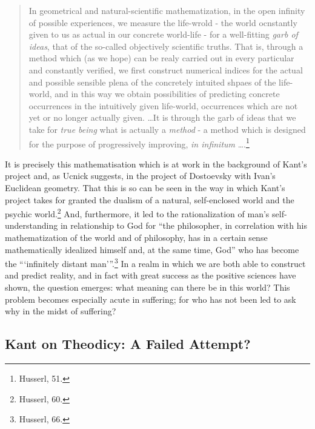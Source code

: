 \documentclass[12pt]{article}
\begin{document}
	\begin{quote}
	\singlespacing
	\footnotesize
	
	In geometrical and natural-scientific mathematization, in the open infinity of possible experiences, we measure the life-wrold - the world ocnstantly given to us as actual in our concrete world-life - for a well-fitting \emph{garb of ideas}, that of the so-called objectively scientific truths. That is, through a method which (as we hope) can be realy carried out in every particular and constantly verified, we first construct numerical indices for the actual and possible sensible plena of the concretely intuited shpaes of the life-world, and in this way we obtain possibilities of predicting concrete occurrences in the intuitively given life-world, occurrences which are not yet or no longer actually given. \ldots It is through the garb of ideas that we take for \emph{true being} what is actually a \emph{method} - a method which is designed for the purpose of progressively improving, \emph{in infinitum} \ldots.\footnote{Husserl, 51.}
	
	\end{quote}
	
	 It is precisely this mathematisation which is at work in the background of Kant's project and, as Ucnick suggests, in the project of Dostoevsky with Ivan's Euclidean geometry. That this is so can be seen in the way in which Kant's project takes for granted the dualism of a natural, self-enclosed world and the psychic world.\footnote{Husserl, 60.} And, furthermore, it led to the rationalization of man's self-understanding in relationship to God for ``the philosopher, in correlation with his mathematization of the world and of philosophy, has in a certain sense mathematically idealized himself and, at the same time, God'' who has become the ``\thinspace`infinitely distant man'\thinspace''.\footnote{Husserl, 66.} In a realm in which we are both able to construct and predict reality, and in fact with great success as the positive sciences have shown, the question emerges: what meaning can there be in this world? This problem becomes especially acute in suffering; for who has not been led to ask why in the midst of suffering?

	\subsection*{Kant on Theodicy: A Failed Attempt?}
	
\end{document}
